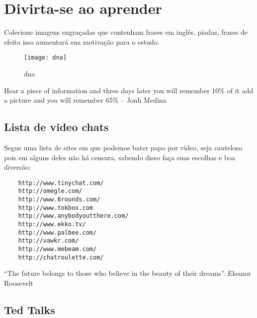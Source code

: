 
\chapter{Divirta-se ao aprender}

Colecione imagens engraçadas que contenham frases em inglês, piadas,
frases de efeito isso aumentará sua motivação para o estudo.

\begin{figure}[h!]
	\centering
	\texttt{[image: dna]}
	\caption{dna}
\end{figure}

\vspace{0.3\baselineskip}
\noindent
{\footnotesize {} Hear a piece of information and three days later you will remember 10\% of it
 add a picture and you will remember 65\% -- Jonh Medina }

\section{Lista de video chats}
\label{sec:lista_de_video_chats}

Segue uma lista de sites em que podemos bater papo por vídeo, seja
cauteloso pois em alguns deles não há censura, sabendo disso faça suas
escolhas e boa diversão:

\begin{verbatim}
	http://www.tinychat.com/
	http://omegle.com/
	http://www.6rounds.com/
	http://www.tokbox.com
	http://www.anybodyoutthere.com/
	http://www.ekko.tv/
	http://www.palbee.com/
	http://vawkr.com/
	http://www.mebeam.com/
	http://chatroulette.com/
\end{verbatim}

\vspace{0.3\baselineskip}
\noindent
{\footnotesize {} ``The future belongs to those who believe in the beauty of their dreams''.  Eleanor Roosevelt  }



\section{Ted Talks}
\label{sec:ted_talks}


